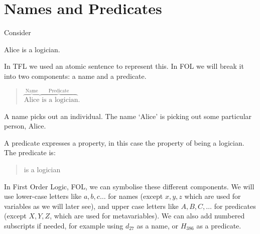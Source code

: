 %
%
%




\section{Names and Predicates}

Consider
\begin{samplesent}
\item Alice is a logician.
\end{samplesent}
In TFL we used an atomic sentence to represent this. In FOL we will break it into two components: a name and a predicate.

\begin{quote}
 $\overbrace{\text{Alice}}^{\text{Name}}\overbrace{\text{ is a logician}}^{\text{Predicate}}$.
\end{quote}

A name picks out an individual. The name `Alice' is picking out some particular person, Alice.

A predicate expresses a property, in this case the property of being a logician. The predicate is:
\begin{quote}
	\gap{} is a logician
\end{quote}


In First Order Logic, FOL, we can symbolise these different components. We will use lower-case letters like $a,b,c\ldots$ for names (except $x,y,z$ which are used for variables as we will later see), and upper case letters like $A,B,C,\ldots$ for predicates (except $X,Y,Z$, which are used for metavariables). We can also add numbered subscripts if needed, for example using $d_{27}$ as a name, or $H_{386}$ as a predicate.

